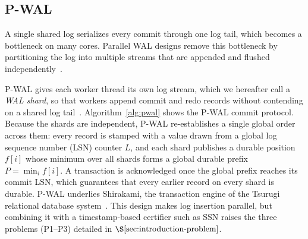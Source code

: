 \subsection{P-WAL}
\label{sec:pwal}

A single shared log serializes every commit through one log tail, which becomes
a bottleneck on many cores.  Parallel WAL designs remove this bottleneck by
partitioning the log into multiple streams that are appended and flushed
independently~\cite{zheng2014silor,wang2014nvm,kamiya2017pwal}.


P-WAL gives each worker thread its own log stream, which we hereafter call a \emph{WAL shard}, so that workers append commit and redo records without contending on a shared log tail~\cite{kamiya2017pwal}.
%
Algorithm~\ref{alg:pwal} shows the P-WAL commit protocol. Because the shards are independent, P-WAL re-establishes a single global order across them: every record is stamped with a value drawn from a global log sequence number (LSN) counter $L$, and each shard publishes a durable position $f[i]$ whose minimum over all shards forms a global durable prefix $P = \min_i f[i]$.  A transaction is acknowledged once the global prefix reaches its commit LSN, which guarantees that every earlier record on every shard is durable.  P-WAL underlies Shirakami, the transaction engine of the Tsurugi relational database system~\cite{kamiya2017pwal, kawashima2025tsurugi}.
%
This design makes log insertion parallel, but combining it with a timestamp-based
certifier such as SSN raises the three problems (P1--P3) detailed in $\S\ref{sec:introduction-problem}$.

